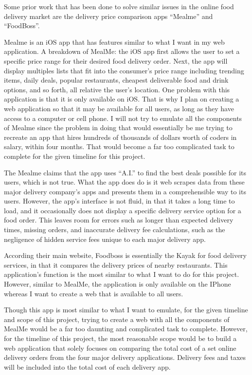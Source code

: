 \documentclass[10pt,twocolumn]{article}
\begin{document}
Some prior work that has been done to solve similar issues in the online food delivery market are the delivery price comparison apps “Mealme”  and “FoodBoss”.

Mealme is an iOS app that has features similar to what I want in my web application. A breakdown of MealMe: the iOS app first allows the user to set a specific price range for their desired food delivery order. Next, the app will display multiples lists that fit into the consumer's price range including trending items, daily deals, popular restaurants, cheapest deliverable food and drink options, and so forth, all relative the user's location. One problem with this application is that it is only available on iOS. That is why I plan on creating a web application so that it may be available for all users, as long as they have access to a computer or cell phone. I will not try to emulate all the components of Mealme since the problem in doing that would essentially be me trying to recreate an app that hires hundreds of thousands of dollars worth of coders in salary, within four months. That would become a far too complicated task to complete for the given timeline for this project.

The Mealme claims that the app uses “A.I.” to find the best deals possible for its users, which is not true. What the app does do is it web scrapes data from these major delivery company's apps and presents them in a comprehensible way to its users. However, the app’s interface is not fluid, in that it takes a long time to load, and it occasionally does not display a specific delivery service option for a food order. This leaves room for errors such as longer than expected delivery times, missing orders, and inaccurate delivery fee calculations, such as the negligence of hidden service fees unique to each major delivery app.

According their main website, Foodboss is essentially the Kayak for food delivery services, in that it compares the delivery prices of nearby restaurants. This application's function is the most similar to what I want to do for this project. However, similar to MealMe, the application is only available on the IPhone whereas I want to create a web that is available to all users.

Though this app is most similar to what I want to emulate, for the given timeline and scope of this project, trying to create a web with all the components of MealMe would be a far too daunting and complicated task to complete. However, for the timeline of this project, the most reasonable scope would be to build a web application that solely focuses on comparing the total cost of a set online delivery orders from the four major delivery applications. Delivery fees and taxes will be included into the total cost of each delivery app.
\end{document}

